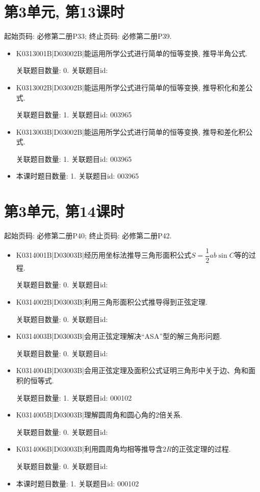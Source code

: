 \section*{第3单元, 第13课时}
起始页码: 必修第二册P33; 终止页码: 必修第二册P39.
\begin{itemize}
\item K0313001B|D03002B|能运用所学公式进行简单的恒等变换, 推导半角公式.

关联题目数量: 0. 关联题目id: 

\item K0313002B|D03002B|能运用所学公式进行简单的恒等变换, 推导积化和差公式.

关联题目数量: 1. 关联题目id: 003965

\item K0313003B|D03002B|能运用所学公式进行简单的恒等变换, 推导和差化积公式.

关联题目数量: 1. 关联题目id: 003965

\item 本课时题目数量: 1. 关联题目id: 003965

\end{itemize}

\section*{第3单元, 第14课时}
起始页码: 必修第二册P40; 终止页码: 必修第二册P42.
\begin{itemize}
\item K0314001B|D03003B|经历用坐标法推导三角形面积公式$S=\dfrac{1}{2}ab\sin C$等的过程.

关联题目数量: 0. 关联题目id: 

\item K0314002B|D03003B|利用三角形面积公式推导得到正弦定理.

关联题目数量: 0. 关联题目id: 

\item K0314003B|D03003B|会用正弦定理解决``ASA''型的解三角形问题.

关联题目数量: 0. 关联题目id: 

\item K0314004B|D03003B|会用正弦定理及面积公式证明三角形中关于边、角和面积的恒等式.

关联题目数量: 1. 关联题目id: 000102

\item K0314005B|D03003B|理解圆周角和圆心角的$2$倍关系.

关联题目数量: 0. 关联题目id: 

\item K0314006B|D03003B|利用圆周角均相等推导含$2R$的正弦定理的过程.

关联题目数量: 0. 关联题目id: 

\item 本课时题目数量: 1. 关联题目id: 000102

\end{itemize}

